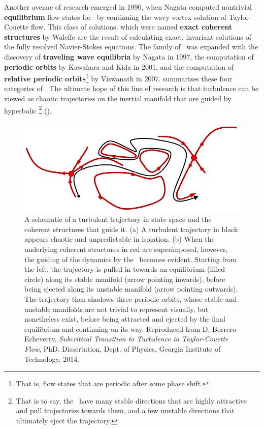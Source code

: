 Another avenue of research emerged in 1990, when Nagata computed nontrivial {\bf equilibrium} flow states for \pCf\ by continuing the wavy vortex solution of Taylor-Couette flow. This class of solutions, which were named {\bf exact coherent structures} by Waleffe are the result of calculating exact, invariant solutions of the fully resolved Navier-Stokes equations. The family of \ecs\ was expanded with the discovery of {\bf traveling wave equilibria} by Nagata in 1997, the computation of {\bf periodic orbits} by Kawahara and Kida in 2001, and the computation of {\bf relative periodic orbits}\footnote{That is, flow states that are periodic after some phase shift.} by Viswanath in 2007.  summarizes these four categories of \ecs. The ultimate hope of this line of research is that turbulence can be viewed as chaotic trajectories on the inertial manifold that are guided by hyperbolic \ecs\footnote{That is to say, the \ecs\ have many stable directions that are highly attractive and pull trajectories towards them, and a few unstable directions that ultimately eject the trajectory.} (). \\

\begin{figure}[h]
\centerline{
\includegraphics[width=\textwidth]{Figs/phaseSpaceTraj.pdf}}
\caption[A schematic of a turbulent trajectory in state space and the coherent structures that guide it.]{A schematic of a turbulent trajectory in state space and the coherent structures that guide it. (a) A turbulent trajectory in black appears chaotic and unpredictable in isolation. (b) When the underlying coherent structures in red are superimposed, however, the guiding of the dynamics by the \ecs\ becomes evident. Starting from the left, the trajectory is pulled in towards an equilibrium (filled circle) along its stable manifold (arrow pointing inwards), before being ejected along its unstable manifold (arrow pointing outwards). The trajectory then shadows three periodic orbits, whose stable and unstable manifolds are not trivial to represent visually, but nonetheless exist, before being attracted and ejected by the final equilibrium and continuing on its way. Reproduced from D. Borrero-Echeverry, \emph{Subcritical Transition to Turbulence in Taylor-Couette Flow}, PhD. Dissertation, Dept. of Physics, Georgia Institute of Technology, 2014.}\label{fig:guidedTurbulence}
\end{figure}

